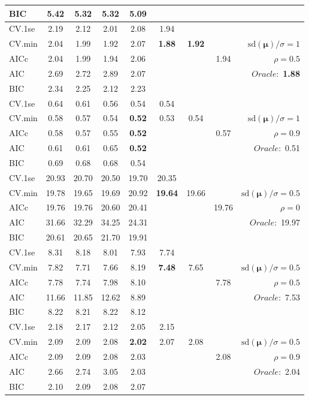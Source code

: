 \begin{table}
\begin{center}
\begin{tabular}{l*{7}{c}|r}
BIC & 5.42 & 5.32 & 5.32 & 5.09 & & & &  \\
 \hline 
CV.1se & 2.19 & 2.12 & 2.01 & 2.08 & 1.94 & & & \\
CV.min & 2.04 & 1.99 & 1.92 & 2.07 & {\bf 1.88} & {\bf 1.92} & & $\mathrm{sd}(\mathbf{\mu})/\sigma=1$ \\
AICc & 2.04 & 1.99 & 1.94 & 2.06 & & & 1.94 &  $\rho=0.5$ \\
AIC & 2.69 & 2.72 & 2.89 & 2.07 & & & &  \multirow{2}{*}{$Oracle: $ {\bf 1.88}} \\
BIC & 2.34 & 2.25 & 2.12 & 2.23 & & & &  \\
 \hline 
CV.1se & 0.64 & 0.61 & 0.56 & 0.54 & 0.54 & & & \\
CV.min & 0.58 & 0.57 & 0.54 & {\bf 0.52} & 0.53 & 0.54 & & $\mathrm{sd}(\mathbf{\mu})/\sigma=1$ \\
AICc & 0.58 & 0.57 & 0.55 & {\bf 0.52} & & & 0.57 &  $\rho=0.9$ \\
AIC & 0.61 & 0.61 & 0.65 & {\bf 0.52} & & & &  \multirow{2}{*}{$Oracle: $ 0.51} \\
BIC & 0.69 & 0.68 & 0.68 & 0.54 & & & &  \\
 \hline 
CV.1se & 20.93 & 20.70 & 20.50 & 19.70 & 20.35 & & & \\
CV.min & 19.78 & 19.65 & 19.69 & 20.92 & {\bf 19.64} & 19.66 & & $\mathrm{sd}(\mathbf{\mu})/\sigma=0.5$ \\
AICc & 19.76 & 19.76 & 20.60 & 20.41 & & & 19.76 &  $\rho=0$ \\
AIC & 31.66 & 32.29 & 34.25 & 24.31 & & & &  \multirow{2}{*}{$Oracle: $ 19.97} \\
BIC & 20.61 & 20.65 & 21.70 & 19.91 & & & &  \\
 \hline 
CV.1se & 8.31 & 8.18 & 8.01 & 7.93 & 7.74 & & & \\
CV.min & 7.82 & 7.71 & 7.66 & 8.19 & {\bf 7.48} & 7.65 & & $\mathrm{sd}(\mathbf{\mu})/\sigma=0.5$ \\
AICc & 7.78 & 7.74 & 7.98 & 8.10 & & & 7.78 &  $\rho=0.5$ \\
AIC & 11.66 & 11.85 & 12.62 & 8.89 & & & &  \multirow{2}{*}{$Oracle: $ 7.53} \\
BIC & 8.22 & 8.21 & 8.22 & 8.12 & & & &  \\
 \hline 
CV.1se & 2.18 & 2.17 & 2.12 & 2.05 & 2.15 & & & \\
CV.min & 2.09 & 2.09 & 2.08 & {\bf 2.02} & 2.07 & 2.08 & & $\mathrm{sd}(\mathbf{\mu})/\sigma=0.5$ \\
AICc & 2.09 & 2.09 & 2.08 & 2.03 & & & 2.08 &  $\rho=0.9$ \\
AIC & 2.66 & 2.74 & 3.05 & 2.03 & & & &  \multirow{2}{*}{$Oracle: $ 2.04} \\
BIC & 2.10 & 2.09 & 2.08 & 2.07 & & & &  \\
 \hline 
\end{tabular}
\end{center}
\vspace{-1cm}
\end{table}





